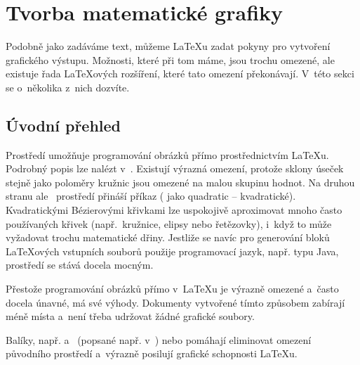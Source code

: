 \setcounter{chapter}{4}
\newcommand{\graphicscompanion}{\emph{The \LaTeX{} Graphics Companion}~\cite{graphicscompanion}} 
\newcommand{\hobby}{\emph{A User's Manual for \MP{}}~\cite{metapost}}
\newcommand{\hoenig}{\emph{\TeX{} Unbound}~\cite{unbound}}
\newcommand{\graphicsinlatex}{\emph{Graphics in \LaTeXe{}}~\cite{ursoswald}}

\chapter{Tvorba matematické grafiky}
\label{chap:graphics}

\begin{intro}
Podobně jako zadáváme text, můžeme \LaTeX u zadat pokyny pro vytvoření
grafického výstupu. Možnosti, které při tom
máme, jsou trochu omezené, ale existuje řada \LaTeX ových
rozšíření, které tato omezení překonávají. V~této sekci se o~několika
z~nich dozvíte.
\end{intro}

\section{Úvodní přehled}
Prostředí  umožňuje programování obrázků přímo prostřednictvím
\LaTeX u. Podrobný popis lze nalézt v~\manual. Existují výrazná omezení,
protože sklony úseček stejně jako poloměry kružnic jsou omezené na malou
skupinu hodnot. Na druhou stranu ale \LaTeXe\ prostředí  přináší
příkaz  ( jako quadratic -- kvadratické).
Kvadratickými Bézierovými
křivkami lze uspokojivě aproximovat mnoho často používaných křivek (např.\
kružnice, elipsy nebo řetězovky), i~když to může vyžadovat trochu
matematické dřiny. Jestliže se navíc pro generování \ci{qbezier} bloků
\LaTeX ových vstupních souborů použije programovací jazyk, např. typu Java, 
prostředí \ei{picture} se stává docela mocným.

Přestože programování obrázků přímo v~\LaTeX u je výrazně omezené
a~často docela únavné, má své výhody. Dokumenty
vytvořené tímto způsobem zabírají méně místa
a~není třeba udržovat žádné grafické soubory.

Balíky, např.  a~ (popsané např. v~\companion) nebo 
pomáhají eliminovat omezení původního prostředí \ei{picture}
a~výrazně posilují grafické schopnosti \LaTeX u.

